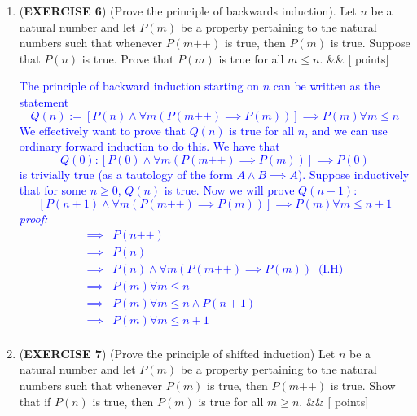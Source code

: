 \documentclass[12pt]{article}
\newcommand{\points}[1]{\hfill {[#1 points]}}
\newcommand{\problem}[2][]{%
  \item {#2}%
  \ifx&#1&%
  \else%
    \points{#1}%
  \fi
  \par\vspace{0.5em}
}
\begin{document}
\begin{enumerate}[leftmargin=*, label=\textbf{\arabic*.}]
	\problem{(\textbf{EXERCISE 6}) (Prove the principle of backwards induction). Let $n$ be a natural number and let $P(m)$ be a property pertaining to the natural numbers such that whenever $P(m\text{++})$ is true, then $P(m)$ is true. Suppose that $P(n)$ is true. Prove that $P(m)$ is true for all $m \leq n$.}
	\textcolor{blue}{The principle of backward induction starting on $n$ can be written as the statement
	\begin{equation}
	Q(n) := [P(n) \land \forall m (P(m\text{++}) \implies P(m))] \implies P(m) \forall m \leq n
	\label{eq:2}
	\end{equation}
	We effectively want to prove that $Q(n)$ is true for all $n$, and we can use ordinary forward induction to do this. We have that $$Q(0) : [P(0) \land \forall m (P(m\text{++}) \implies P(m))] \implies P(0)$$ is trivially true (as a tautology of the form $A \land B \implies A$). Suppose inductively that for some $n \geq 0$, $Q(n)$ is true. Now we will prove $Q(n+1)$: $$[P(n+1) \land \forall m (P(m\text{++}) \implies P(m))] \implies P(m) \forall m \leq n+1$$ \textit{proof:}
	\begin{align*}
	[P(n+1) \land \forall m (P(m\text{++}) \implies P(m))] \implies& P(n\text{++}) \\
	\implies& P(n) \\
	\implies& P(n) \land \forall m (P(m\text{++}) \implies P(m))  \;\; \text{(I.H)} \\
	\implies& P(m) \forall m \leq n \\
	\implies& P(m) \forall m \leq n \land P(n+1)  \\
	\implies& P(m) \forall m \leq n + 1\\
	\end{align*}}
	
	\problem{(\textbf{EXERCISE 7}) (Prove the principle of shifted induction) Let $n$ be a natural number and let $P(m)$ be a property pertaining to the natural numbers such that whenever $P(m)$ is true, then $P(m\text{++})$ is true. Show that if $P(n)$ is true, then $P(m)$ is true for all $m \geq n$.}
	

\end{enumerate}
\end{document}
